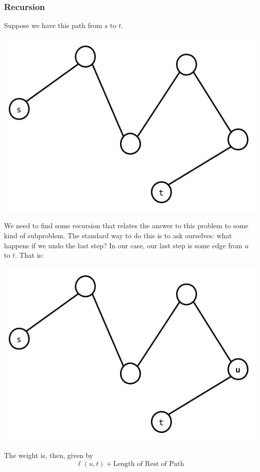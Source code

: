\documentclass[letterpaper]{article}
\begin{document}
\subsubsection{Recursion}
Suppose we have this path from $s$ to $t$. 
\begin{center}
    \includegraphics[scale=0.4]{assets/st_path_1.png}
\end{center}
We need to find some recursion that relates the answer to this problem to some kind of subproblem. The standard way to do this is to ask ourselves: what happens if we undo the last step? In our case, our last step is some edge from $u$ to $t$. That is: 
\begin{center}
    \includegraphics[scale=0.4]{assets/st_path_2.png}
\end{center}
The weight is, then, given by 
\[\ell(u, t) + \text{Length of Rest of Path}\]
\end{document}
